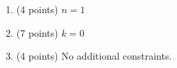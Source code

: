 \begin{enumerate}
    \tightlist
    \item (4 points) $n = 1$
    \item (7 points) $k = 0$
    \item (4 points) No additional constraints.
\end{enumerate}
    